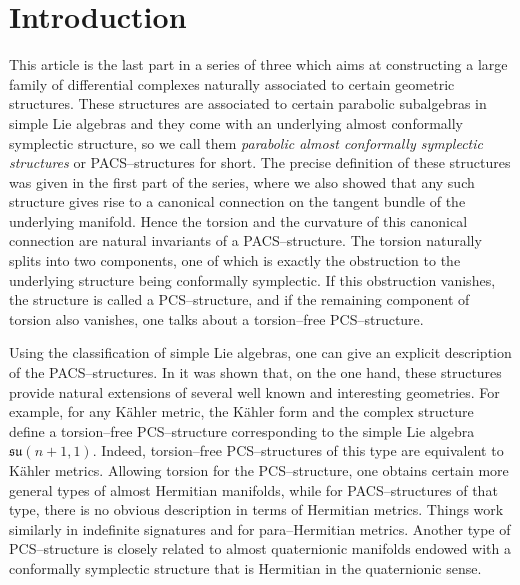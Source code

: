 \documentclass[12pt,a4paper]{amsart}
\def\frak{\mathfrak}
\numberwithin{theorem}{section}
\theoremstyle{definition}
\theoremstyle{remark}
\begin{document}
\maketitle

\pagestyle{myheadings} 
 
\section{Introduction}\label{1}

This article is the last part in a series of three which aims at
constructing a large family of differential complexes naturally
associated to certain geometric structures. These structures are
associated to certain parabolic subalgebras in simple Lie algebras and
they come with an underlying almost conformally symplectic structure,
so we call them \textit{parabolic almost conformally symplectic
  structures} or PACS--structures for short. The precise definition of
these structures was given in the first part \cite{PCS1} of the
series, where we also showed that any such structure gives rise to a
canonical connection on the tangent bundle of the underlying
manifold. Hence the torsion and the curvature of this canonical
connection are natural invariants of a PACS--structure. The torsion
naturally splits into two components, one of which is exactly the
obstruction to the underlying structure being conformally
symplectic. If this obstruction vanishes, the structure is called a
PCS--structure, and if the remaining component of torsion also vanishes,
one talks about a torsion--free PCS--structure.

Using the classification of simple Lie algebras, one can give an
explicit description of the PACS--structures. In \cite{PCS1} it was
shown that, on the one hand, these structures provide natural
extensions of several well known and interesting geometries. For
example, for any K\"ahler metric, the K\"ahler form and the complex
structure define a torsion--free PCS--structure corresponding to the
simple Lie algebra $\frak{su}(n+1,1)$. Indeed, torsion--free
PCS--structures of this type are equivalent to K\"ahler metrics.
Allowing torsion for the PCS--structure, one obtains certain more
general types of almost Hermitian manifolds, while for
PACS--structures of that type, there is no obvious description in
terms of Hermitian metrics. Things work similarly in indefinite
signatures and for para--Hermitian metrics. Another type of
PCS--structure is closely related to almost quaternionic manifolds
endowed with a conformally symplectic structure that is Hermitian in
the quaternionic sense. 
\end{document}
